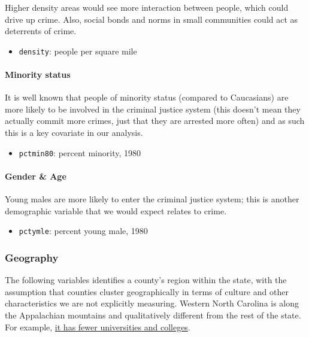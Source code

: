 \documentclass[]{article}
\providecommand{\tightlist}{%
  \setlength{\itemsep}{0pt}\setlength{\parskip}{0pt}}
\let\oldparagraph\paragraph
\renewcommand{\paragraph}[1]{\oldparagraph{#1}\mbox{}}
\begin{document}
Higher density areas would see more interaction between people, which
could drive up crime. Also, social bonds and norms in small communities
could act as deterrents of crime.

\begin{itemize}
\tightlist
\item
  \texttt{density}: people per square mile
\end{itemize}

\hypertarget{minority-status}{%
\paragraph{Minority status}\label{minority-status}}

It is well known that people of minority status (compared to Caucasians)
are more likely to be involved in the criminal justice system (this
doesn't mean they actually commit more crimes, just that they are
arrested more often) and as such this is a key covariate in our
analysis.

\begin{itemize}
\tightlist
\item
  \texttt{pctmin80}: percent minority, 1980
\end{itemize}

\hypertarget{gender-age}{%
\paragraph{Gender \& Age}\label{gender-age}}

Young males are more likely to enter the criminal justice system; this
is another demographic variable that we would expect relates to crime.

\begin{itemize}
\tightlist
\item
  \texttt{pctymle}: percent young male, 1980
\end{itemize}

\hypertarget{geography}{%
\subsubsection{Geography}\label{geography}}

The following variables identifies a county's region within the state,
with the assumption that counties cluster geographically in terms of
culture and other characteristics we are not explicitly measuring.
Western North Carolina is along the Appalachian mountains and
qualitatively different from the rest of the state. For example,
\href{https://www.google.com/maps/search/universities+colleges+north+carolina/@35.6210094,-82.5051642,7z}{it
has fewer universities and colleges}.
\end{document}
